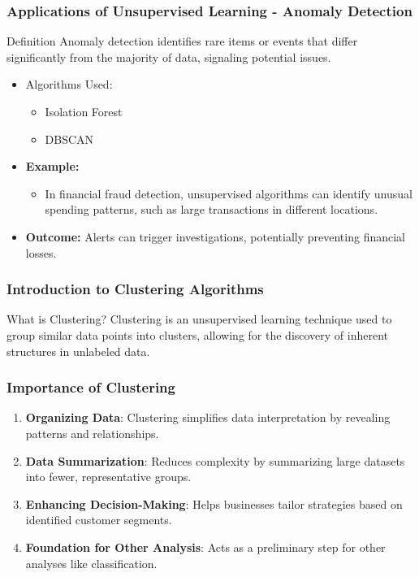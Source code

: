 \documentclass[aspectratio=169]{beamer}
\begin{document}
\begin{frame}[fragile]
  \frametitle{Applications of Unsupervised Learning - Anomaly Detection}
  \begin{block}{Definition}
    Anomaly detection identifies rare items or events that differ significantly from the majority of data, signaling potential issues.
  \end{block}
  
  \begin{itemize}
    \item Algorithms Used:
    \begin{itemize}
        \item Isolation Forest
        \item DBSCAN
    \end{itemize}
    \item \textbf{Example:}
    \begin{itemize}
        \item In financial fraud detection, unsupervised algorithms can identify unusual spending patterns, such as large transactions in different locations.
    \end{itemize}
    \item \textbf{Outcome:} Alerts can trigger investigations, potentially preventing financial losses.
  \end{itemize}
\end{frame}

\begin{frame}[fragile]
    \frametitle{Introduction to Clustering Algorithms}
    \begin{block}{What is Clustering?}
        Clustering is an unsupervised learning technique used to group similar data points into clusters, allowing for the discovery of inherent structures in unlabeled data.
    \end{block}
\end{frame}

\begin{frame}[fragile]
    \frametitle{Importance of Clustering}
    \begin{enumerate}
        \item \textbf{Organizing Data}:
        Clustering simplifies data interpretation by revealing patterns and relationships.
        
        \item \textbf{Data Summarization}:
        Reduces complexity by summarizing large datasets into fewer, representative groups.

        \item \textbf{Enhancing Decision-Making}:
        Helps businesses tailor strategies based on identified customer segments.
        
        \item \textbf{Foundation for Other Analysis}:
        Acts as a preliminary step for other analyses like classification.
    \end{enumerate}
\end{frame}
\end{document}
